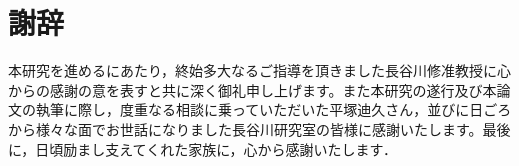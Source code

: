 ﻿%
\chapter*{謝辞}

本研究を進めるにあたり，終始多大なるご指導を頂きました長谷川修准教授に心からの感謝の意を表すと共に深く御礼申し上げます。また本研究の遂行及び本論文の執筆に際し，度重なる相談に乗っていただいた平塚迪久さん，並びに日ごろから様々な面でお世話になりました長谷川研究室の皆様に感謝いたします。最後に，日頃励まし支えてくれた家族に，心から感謝いたします．
